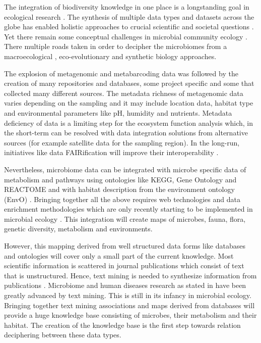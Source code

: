 The integration of biodiversity knowledge in one place is a longstanding
goal in ecological research \parencite{Walter_2012}. The synthesis of multiple
data types and datasets across the globe has enabled 
holistic approaches to crucial scientific and societal questions \parencite{heberling_j_mason_data_2021}.
Yet there remain some conceptual challenges in microbial community ecology \parencite{prosser2020Conceptual}.
There multiple roads taken in order to decipher the microbiomes from a macroecological \parencite{Mascarenhas2020}, 
eco-evolutionary \parencite{martiny2023Investigating, loreau2023Opportunities} and synthetic biology \parencite{Leggieri2021} approaches.

The explosion of metagenomic and metabarcoding data was followed by the creation
of many repositories and databases, some project specific and some that
collected many different sources. The metadata richness of metagenomic data
varies depending on the sampling and it may include location data, habitat type
and environmental parameters like pH, humidity and nutrients. Metadata
deficiency of data is a limiting step for the ecosystem function analysis
which, in the short-term can be resolved with data integration solutions from
alternative sources (for example satellite data for the sampling region). In
the long-run, initiatives like data FAIRification will improve their
interoperability \parencite{wilkinson2016the-fair}.



Nevertheless, microbiome data can be integrated with microbe
specific data of metabolism and pathways using ontologies like KEGG, Gene
Ontology and REACTOME and with habitat description from the environment
ontology (EnvO) \parencite{buttigieg2016environment}. Bringing together all the above requires web technologies and
data enrichment methodologies which are only recently starting to be
implemented in microbial ecology \parencite{jiang2016Microbiome}. This integration
will create maps of microbes, fauna, flora, genetic diversity, metabolism and environments. 

However, this mapping derived from well structured data forms like databases
and ontologies will cover only a small part of the current knowledge. Most
scientific information is scattered in journal publications which consist of
text that is unstructured. Hence, text mining is needed to synthesize
information from publications \parencite{jensen2006Literature}. Microbiome and
human diseases research as stated in \parencite{badal2019Challenges} have been
greatly advanced by text mining. This is still in its infancy in microbial
ecology. Bringing together text mining associations and maps derived from
databases will provide a huge knowledge base consisting of microbes, their
metabolism and their habitat. The creation of the knowledge base is the first
step towards relation deciphering between these data types.

